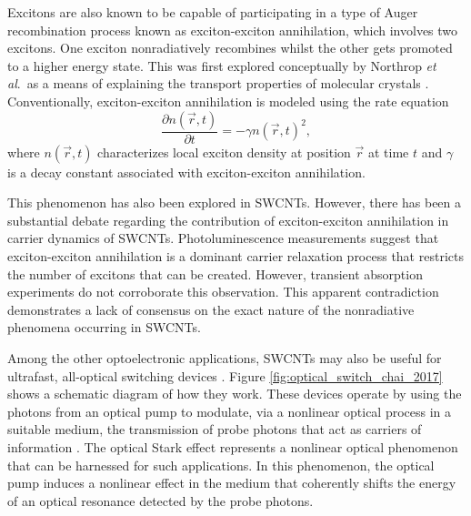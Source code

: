 Excitons are also known to be capable of participating in a type of Auger recombination process known as exciton-exciton annihilation, which involves two excitons. One exciton nonradiatively recombines whilst the other gets promoted to a higher energy state. This was first explored conceptually by Northrop \textit{et al}.\ as a means of explaining the transport properties of molecular crystals \cite{northrop1958electronic}. Conventionally, exciton-exciton annihilation is modeled using the rate equation
%
\begin{equation}
	\frac{\partial n(\vec{r}, t)}{\partial t} = - \gamma n(\vec{r}, t)^2,
	\label{eq:rate_eq_exc_anih}
\end{equation}
%
where $n(\vec{r}, t)$ characterizes local exciton density at position $\vec{r}$ at time $t$ and $\gamma$ is a decay constant associated with exciton-exciton annihilation.

This phenomenon has also been explored in SWCNTs. However, there has been a substantial debate regarding the contribution of exciton-exciton annihilation in carrier dynamics of SWCNTs. Photoluminescence measurements suggest that exciton-exciton annihilation is a dominant carrier relaxation process that restricts the number of excitons that can be created. However, transient absorption experiments do not corroborate this observation. This apparent contradiction demonstrates a lack of consensus on the exact nature of the nonradiative phenomena occurring in SWCNTs.

Among the other optoelectronic applications, SWCNTs may also be useful for ultrafast, all-optical switching devices \cite{chai2017ultrafast}. Figure \ref{fig:optical_switch_chai_2017} shows a schematic diagram of how they work. These devices operate by using the photons from an optical pump to modulate, via a nonlinear optical process in a suitable medium, the transmission of probe photons that act as carriers of information \cite{chai2017ultrafast}. The optical Stark effect represents a nonlinear optical phenomenon that can be harnessed for such applications. In this phenomenon, the optical pump induces a nonlinear effect in the medium that coherently shifts the energy of an optical resonance detected by the probe photons.

